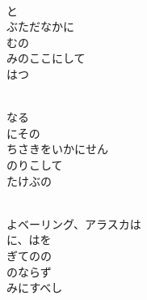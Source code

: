 \documentclass[10pt,b5j]{tarticle} %
\begin{document}
\vspace{1.5em} %
\newcommand{\linespace}{0.5em} %
\newcommand{\blocksize}{0.5\hsize} %
\newcommand{\itemmargin}{3em} %
\begin{enumerate} %
    \setlength{\itemindent}{\itemmargin} %
    \begin{minipage}[c]{\blocksize}
    
        \vspace{\linespace}
        \item~\\
        と\\
        ぶただなかに\\
        むの\\
        みのここにして\\
        はつ
        
    \end{minipage}
    \begin{minipage}[c]{\blocksize}
        
        \vspace{\linespace}
        \item~\\
        なる\\
        にその\\
        ちさきをいかにせん\\
        のりこして\\
        たけぶの
        
    \end{minipage}
    \begin{minipage}[c]{\blocksize}
        
        \vspace{\linespace}
        \item~\\
        よベーリング、アラスカは\\
        に、はを\\
        ぎてのの\\
        のならず\\
        みにすべし
        

\end{minipage}
\end{enumerate}
\end{document}
